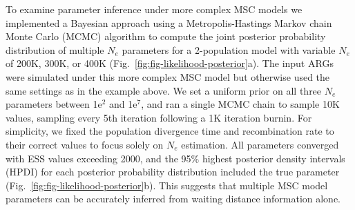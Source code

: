 \documentclass[11pt]{article}
\begin{document}
To examine parameter inference under more complex MSC models we 
implemented a Bayesian approach using a Metropolis-Hastings Markov 
chain Monte Carlo (MCMC) algorithm to compute the joint posterior 
probability distribution of multiple $N_e$ parameters for a 
2-population model with variable $N_e$ of 200K, 300K, or 400K
(Fig.~\ref{fig:fig-likelihood-posterior}a).
The input ARGs were simulated under this more complex MSC model but otherwise
used the same settings as in the example above.
We set a uniform prior on all three $N_e$ parameters between 
1e$^2$ and 1e$^7$, and ran a single MCMC chain to sample 10K 
values, sampling every 5th iteration following a 1K iteration burnin. 
For simplicity, we fixed the population divergence time and
recombination rate to their correct values to focus solely on 
$N_e$ estimation. 
% 
% 
% 
All parameters converged with ESS values exceeding 2000, 
and the 95\% highest posterior density intervals (HPDI) for
each posterior probability distribution included the true 
parameter
(Fig.~\ref{fig:fig-likelihood-posterior}b).
% 
% 
This suggests that multiple MSC model parameters can be accurately 
inferred from waiting distance information alone. 


\end{document}
